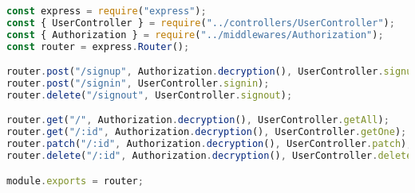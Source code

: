 \begin{lstlisting}[language=Javascript,caption={User Route}]
const express = require("express");
const { UserController } = require("../controllers/UserController");
const { Authorization } = require("../middlewares/Authorization");
const router = express.Router();

router.post("/signup", Authorization.decryption(), UserController.signup);
router.post("/signin", UserController.signin);
router.delete("/signout", UserController.signout);

router.get("/", Authorization.decryption(), UserController.getAll);
router.get("/:id", Authorization.decryption(), UserController.getOne);
router.patch("/:id", Authorization.decryption(), UserController.patch);
router.delete("/:id", Authorization.decryption(), UserController.delete);

module.exports = router;
\end{lstlisting}